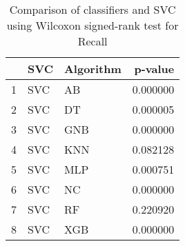 \begin{table}
\footnotesize
\caption{Comparison of classifiers and SVC using Wilcoxon signed-rank test for Recall}
\label{tab:SVC wilcoxon Recall comparison}
\begin{tabular}{lllr}
\hline
 & SVC & Algorithm & p-value \\
\hline
1 & SVC & AB & 0.000000 \\
2 & SVC & DT & 0.000005 \\
3 & SVC & GNB & 0.000000 \\
4 & SVC & KNN & 0.082128 \\
5 & SVC & MLP & 0.000751 \\
6 & SVC & NC & 0.000000 \\
7 & SVC & RF & 0.220920 \\
8 & SVC & XGB & 0.000000 \\
\hline
\end{tabular}
\end{table}
